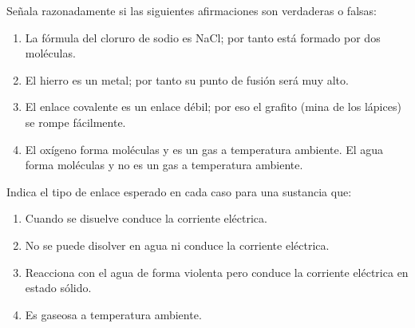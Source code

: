 \begin{prob}
Señala razonadamente si las siguientes afirmaciones son verdaderas o falsas:
\begin{enumerate}
\item La fórmula del cloruro de sodio es NaCl; por tanto está formado por dos moléculas.
\item El hierro es un metal; por tanto su punto de fusión será muy alto.
\item El enlace covalente es un enlace débil; por eso el grafito (mina de los lápices) se rompe fácilmente.
\item El oxígeno forma moléculas y es un gas a temperatura ambiente. El agua forma moléculas y no es un 
gas a temperatura ambiente.
\end{enumerate}
\end{prob}


\begin{prob}
Indica el tipo de enlace esperado en cada caso para una sustancia que:
\begin{enumerate}
\item Cuando se disuelve conduce la corriente eléctrica.
\item No se puede disolver en agua ni conduce la corriente eléctrica.
\item Reacciona con el agua de forma violenta pero conduce la corriente eléctrica en estado sólido.
\item Es gaseosa a temperatura ambiente.
\end{enumerate}
\end{prob}